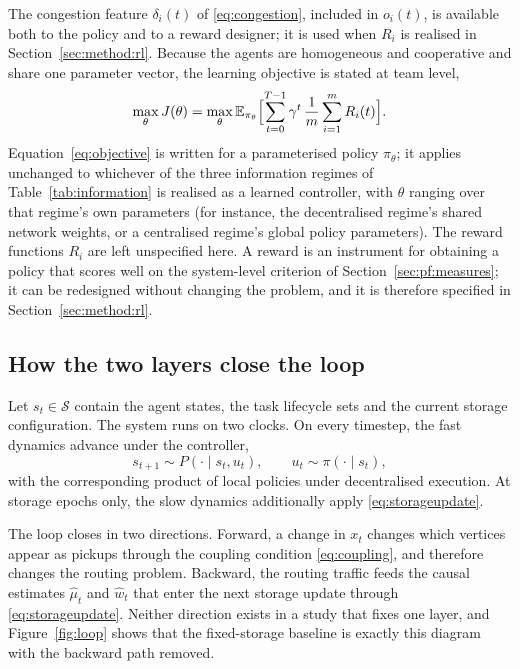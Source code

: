 \documentclass[../main.tex]{subfiles}
\begin{document}
The congestion feature $\delta_i(t)$ of \eqref{eq:congestion}, included in %
$o_i(t)$, is available both to the policy and to a reward designer; it is used
when $R_i$ is realised in Section~\ref{sec:method:rl}.
Because the agents are homogeneous and cooperative and share one parameter
vector, the learning objective is stated at team level,
\begin{equation}
  \max_{\theta} J(\theta)
    = \max_{\theta} \mathbb{E}_{\pi_\theta}
      \Bigl[ \sum_{t=0}^{T-1} \gamma^{t}\, \frac{1}{m} \sum_{i=1}^{m} R_i(t) \Bigr].
  \label{eq:objective}
\end{equation}
Equation~\eqref{eq:objective} is written for a parameterised policy $\pi_\theta$; %
it applies unchanged to whichever of the three information regimes of
Table~\ref{tab:information} is realised as a learned controller, with $\theta$
ranging over that regime's own parameters (for instance, the decentralised
regime's shared network weights, or a centralised regime's global policy
parameters). The reward functions $R_i$ are left unspecified here. A reward is an
instrument for obtaining a policy that scores well on the system-level criterion
of Section~\ref{sec:pf:measures}; it can be redesigned without changing the
problem, and it is therefore specified in Section~\ref{sec:method:rl}.

\subsection{How the two layers close the loop}
\label{sec:pf:coupling}

Let $s_t \in \mathcal{S}$ contain the agent states, the task lifecycle sets and
the current storage configuration. The system runs on two clocks. On every
timestep, the fast dynamics advance under the controller,
\[
  s_{t+1} \sim P(\cdot \mid s_t, u_t), \qquad u_t \sim \pi(\cdot \mid s_t),
\]
with the corresponding product of local policies under decentralised execution.
At storage epochs only, the slow dynamics additionally apply
\eqref{eq:storageupdate}.

The loop closes in two directions. Forward, a change in $x_t$ changes which
vertices appear as pickups through the coupling condition
\eqref{eq:coupling}, and therefore changes the routing problem. Backward, the
routing traffic feeds the causal estimates $\hat\mu_t$ and $\hat w_t$ that
enter the next storage update through \eqref{eq:storageupdate}. Neither
direction exists in a study that fixes
one layer, and Figure~\ref{fig:loop} shows that the fixed-storage baseline is
exactly this diagram with the backward path removed.
\end{document}
